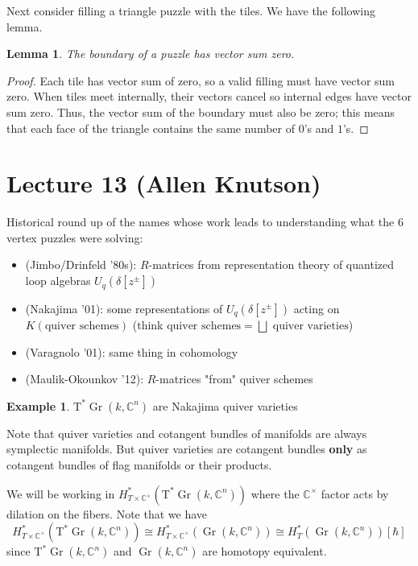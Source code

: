 \documentclass[12pt]{amsart}
\numberwithin{equation}{section}
\newtheorem{Lemma}[equation]{Lemma}
\theoremstyle{definition}
\newtheorem{Example}[equation]{Example}
\numberwithin{figure}{section}
\newcommand{\C}{\mathbb{C}}
\newcommand{\on}[1]{\operatorname{#1}}
\newcommand{\Gr}{\on{Gr}}
\begin{document}
Next consider filling a triangle puzzle with the tiles. We have the following lemma.
\begin{Lemma}
    The boundary of a puzzle has vector sum zero.
\end{Lemma}
\begin{proof}
    Each tile has vector sum of zero, so a valid filling must have vector sum zero. When tiles meet internally, their vectors cancel so internal edges have vector sum zero. Thus, the vector sum of the boundary must also be zero; this means that each face of the triangle contains the same number of $0$'s and $1$'s.
\end{proof}

\section{Lecture 13 (Allen Knutson)}


Historical round up of the names whose work leads to understanding what the $6$ vertex puzzles were solving:
\begin{itemize}
	\item (Jimbo/Drinfeld '80s): $R$-matrices from representation theory of quantized loop algebras $U_q(\delta[z^\pm])$
	\item (Nakajima '01): some representations of $U_q(\delta[z^\pm])$ acting on $K(\text{quiver schemes})$ (think $\text{quiver schemes} = \bigsqcup \text{ quiver varieties}$)
	\item (Varagnolo '01): same thing in cohomology
	\item (Maulik-Okounkov '12): $R$-matrices "from" quiver schemes
\end{itemize}

\begin{Example}
	$\text{T}^* \Gr(k, \C^n)$ are Nakajima quiver varieties
\end{Example}

Note that quiver varieties and cotangent bundles of manifolds are always symplectic manifolds.
But quiver varieties are cotangent bundles \textbf{only} as cotangent bundles of flag manifolds or their products.

We will be working in $H^*_{T\times \C^\times} (\text{T}^* \Gr(k, \C^n))$ where the $\C^\times$ factor acts by dilation on the fibers. Note that we have
\[
	H^*_{T\times \C^\times} (\text{T}^* \Gr(k,\C^n)) \cong H^*_{T\times \C^\times} (\Gr(k,\C^n)) \cong H^*_{T} (\Gr(k,\C^n)) [\hbar]
\]
since $\text{T}^* \Gr(k,\C^n)$ and $\Gr(k,\C^n)$ are homotopy equivalent.
\end{document}
